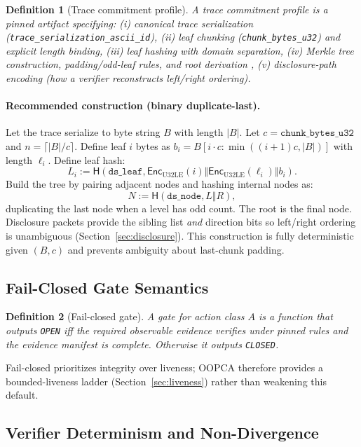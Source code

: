 \documentclass[11pt]{article}
\newcommand{\Hash}{\mathsf{H}}
\newcommand{\Enc}{\mathsf{Enc}}
\newtheorem{definition}{Definition}
\begin{document}
\begin{definition}[Trace commitment profile]
A trace commitment profile is a pinned artifact specifying:
(i) canonical trace serialization (\texttt{trace\_serialization\_ascii\_id}),
(ii) leaf chunking (\texttt{chunk\_bytes\_u32}) and explicit length binding,
(iii) leaf hashing with domain separation,
(iv) Merkle tree construction, padding/odd-leaf rules, and root derivation \cite{Merkle1988},
(v) disclosure-path encoding (how a verifier reconstructs left/right ordering).
\end{definition}

\paragraph{Recommended construction (binary duplicate-last).}
Let the trace serialize to byte string $B$ with length $|B|$. Let $c=\texttt{chunk\_bytes\_u32}$ and $n=\lceil |B|/c \rceil$.
Define leaf $i$ bytes as $b_i=B[i\cdot c : \min((i+1)c,|B|)]$ with length $\ell_i$.
Define leaf hash:
\[
L_i := \Hash(\texttt{ds\_leaf}, \Enc_{\text{U32LE}}(i)\Vert \Enc_{\text{U32LE}}(\ell_i)\Vert b_i).
\]
Build the tree by pairing adjacent nodes and hashing internal nodes as:
\[
N := \Hash(\texttt{ds\_node}, L \Vert R),
\]
duplicating the last node when a level has odd count. The root is the final node.
Disclosure packets provide the sibling list \emph{and} direction bits so left/right ordering is unambiguous (Section~\ref{sec:disclosure}).
This construction is fully deterministic given $(B,c)$ and prevents ambiguity about last-chunk padding.

\subsection{Fail-Closed Gate Semantics}

\begin{definition}[Fail-closed gate]
A gate for action class $A$ is a function that outputs \texttt{OPEN} iff the required observable evidence verifies under pinned rules and the evidence manifest is complete. Otherwise it outputs \texttt{CLOSED}.
\end{definition}

Fail-closed prioritizes integrity over liveness; OOPCA therefore provides a bounded-liveness ladder (Section~\ref{sec:liveness}) rather than weakening this default.


\subsection{Verifier Determinism and Non-Divergence}\label{sec:determinism}
\end{document}
